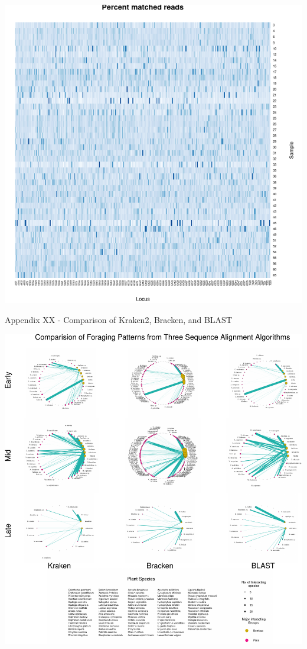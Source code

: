 \documentclass[
]{article}
\begin{document}
\includegraphics[width=0.98\linewidth]{../graphics/plots/Percent_loci_matched_by_sample}

\newpage

Appendix XX - Comparison of Kraken2, Bracken, and BLAST

\includegraphics[width=1.1\linewidth]{../graphics/plots/Molecular_nets-crop}
\end{document}
